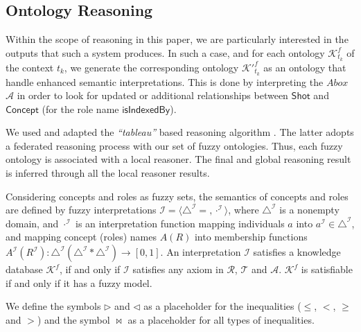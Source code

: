 		\subsection{Ontology Reasoning}
		Within the scope of reasoning in this paper, we are particularly interested in the outputs that
		such a system produces. In such a case, and for each ontology $\mathcal{K}^{f}_{t_{k}}$ 
		of the context $t_{k}$, we generate 
		the corresponding ontology $\mathcal{K'}^{f}_{t_{k}}$ as an ontology that handle enhanced 
		semantic interpretations. This is done by 
		interpreting the $Abox$ $\mathcal{A}$ in order to look for updated or additional relationships between 
		$\mathsf{Shot}$ and $\mathsf{Concept}$ (for the role name
		$\mathsf{isIndexedBy}$).

		We used and adapted the \emph{``tableau''} based reasoning algorithm \citep{Dentler2011}. The latter  
		adopts a federated reasoning process with our set of fuzzy ontologies. Thus, each fuzzy ontology is 
		associated with a local reasoner. The final and global reasoning  result is inferred through 
		all the local reasoner results. 


		Considering concepts and roles as fuzzy sets, the semantics of concepts and roles are defined 
		by fuzzy interpretations $\mathcal{I} = \langle{}\triangle^{\mathcal{I}}= , \cdot^{\mathcal{I}}\rangle{}$, 
		where $\triangle^{\mathcal{I}}$ is a nonempty domain, and $\cdot^{\mathcal{I}}$ is an interpretation 
		function mapping individuals $a$ into $a^{\mathcal{I}} \in \triangle^{\mathcal{I}}$,
		and mapping concept (roles) names $A(R)$ into membership functions 
		$A^{\mathcal{I}}(R^{\mathcal{I}}) : \triangle^{\mathcal{I}} (\triangle^{\mathcal{I}} * \triangle^{\mathcal{I}} ) 
		\rightarrow [0, 1]$. 
		An interpretation $\mathcal{I}$ satisfies a knowledge database $\mathcal{K}^{f}_{}$, 
		if and only if  $\mathcal{I}$ satisfies any
		axiom in $\mathcal{R}$, $\mathcal{T}$ and $\mathcal{A}$. $\mathcal{K}^{f}_{}$ is satisfiable 
		if and only if it has a fuzzy model.

		We define the symbols  $\rhd$ and  $\lhd$ as a placeholder for the  inequalities 
		($\leq$, $<$, $\geq$ and $>$) and the symbol $\bowtie$ as a placeholder for all types of inequalities.
		
